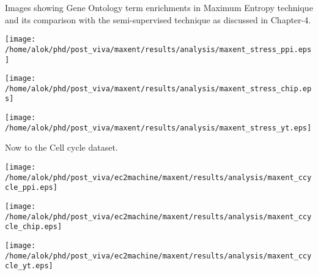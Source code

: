 Images showing Gene Ontology term enrichments in Maximum Entropy technique and its comparison with the semi-supervised technique as discussed in Chapter-4.
\begin{center}
 \texttt{[image: /home/alok/phd/post\_viva/maxent/results/analysis/maxent\_stress\_ppi.eps]}
\end{center}
\begin{center}
 \texttt{[image: /home/alok/phd/post\_viva/maxent/results/analysis/maxent\_stress\_chip.eps]}
\end{center}
\begin{center}
 \texttt{[image: /home/alok/phd/post\_viva/maxent/results/analysis/maxent\_stress\_yt.eps]}
\end{center}

Now to the Cell cycle dataset.
\begin{center}
 \texttt{[image: /home/alok/phd/post\_viva/ec2machine/maxent/results/analysis/maxent\_ccycle\_ppi.eps]}
\end{center}

\begin{center}
 \texttt{[image: /home/alok/phd/post\_viva/ec2machine/maxent/results/analysis/maxent\_ccycle\_chip.eps]}
\end{center}
\begin{center}
 \texttt{[image: /home/alok/phd/post\_viva/ec2machine/maxent/results/analysis/maxent\_ccycle\_yt.eps]}
\end{center}
